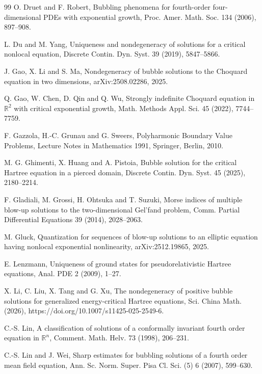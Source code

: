 \documentclass[11pt]{article}
\numberwithin{equation}{section}
\begin{document}
\begin{thebibliography}{99}
O. Druet and F. Robert,
Bubbling phenomena for fourth-order four-dimensional PDEs with exponential growth,
Proc. Amer. Math. Soc. 134 (2006), 897--908.

L. Du and M. Yang,
Uniqueness and nondegeneracy of solutions for a critical nonlocal equation,
Discrete Contin. Dyn. Syst. 39 (2019), 5847--5866.

J. Gao, X. Li and S. Ma,
Nondegeneracy of bubble solutions to the Choquard equation in two dimensions,
arXiv:2508.02286, 2025.

Q. Gao, W. Chen, D. Qin and Q. Wu,
Strongly indefinite Choquard equation in $\mathbb R^2$ with critical
exponential growth,
Math. Methods Appl. Sci. 45 (2022), 7744--7759.

F. Gazzola, H.-C. Grunau and G. Sweers,
Polyharmonic Boundary Value Problems,
Lecture Notes in Mathematics 1991, Springer, Berlin, 2010.

M. G. Ghimenti, X. Huang and A. Pistoia,
Bubble solution for the critical Hartree equation in a pierced domain,
Discrete Contin. Dyn. Syst. 45 (2025), 2180--2214.

F. Gladiali, M. Grossi, H. Ohtsuka and T. Suzuki,
Morse indices of multiple blow-up solutions to the two-dimensional Gel'fand problem,
Comm. Partial Differential Equations 39 (2014), 2028--2063.

M. Gluck,
Quantization for sequences of blow-up solutions to an elliptic equation having nonlocal exponential nonlinearity,
arXiv:2512.19865, 2025.

E. Lenzmann,
Uniqueness of ground states for pseudorelativistic Hartree equations,
Anal. PDE 2 (2009), 1--27.

X. Li, C. Liu, X. Tang and G. Xu,
The nondegeneracy of positive bubble solutions for generalized energy-critical Hartree equations,
Sci. China Math. (2026), https://doi.org/10.1007/s11425-025-2549-6.

C.-S. Lin,
A classification of solutions of a conformally invariant fourth order equation in $\mathbb R^{n}$,
Comment. Math. Helv. 73 (1998), 206--231.

C.-S. Lin and J. Wei,
Sharp estimates for bubbling solutions of a fourth order mean field equation,
Ann. Sc. Norm. Super. Pisa Cl. Sci. (5) 6 (2007), 599--630.


\end{thebibliography}
\end{document}
